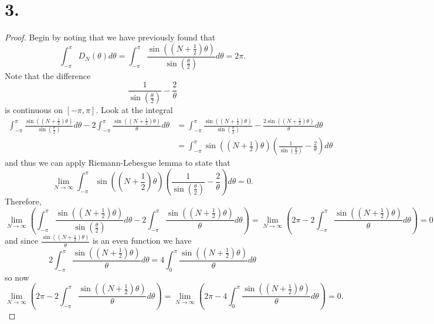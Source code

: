 \documentclass{article}
\begin{document}
\section*{3.}
\begin{proof}
    Begin by noting that we have previously found that 
    \[
    \int_{-\pi}^{\pi} D_N(\theta)d \theta = \int_{-\pi}^{\pi} \frac{\sin\left(\left(N + \frac{1}{2} \right)\theta\right)}{\sin\left(\frac{\theta}{2}\right)} d \theta = 2 \pi.    
    \]
    Note that the difference \[
    \frac{1}{\sin\left(\frac{\theta}{2}\right)} - \frac{2}{\theta}    
    \]
    is continuous on $[-\pi, \pi]$. 
    Look at the integral 
    \begin{align*}
     \int_{-\pi}^{\pi} \frac{\sin\left(\left(N + \frac{1}{2} \right)\theta\right)}{\sin\left(\frac{\theta}{2}\right)} d \theta - 2 \int_{-\pi}^{\pi} \frac{\sin\left(\left(N + \frac{1}{2} \right)\theta\right)} {\theta} d \theta  &= 
    \int_{-\pi}^{\pi} \frac{\sin\left(\left(N + \frac{1}{2} \right)\theta\right)}{\sin\left(\frac{\theta}{2}\right)} - \frac{2\sin\left(\left(N + \frac{1}{2} \right)\theta\right)} {\theta} d \theta\\ &= \int_{-\pi}^{\pi} \sin\left(\left(N + \frac{1}{2} \right)\theta\right) \left(\frac{1}{\sin\left(\frac{\theta}{2} \right)} - \frac{2}{\theta} \right) d\theta
    \end{align*}
    and thus we can apply Riemann-Lebesgue lemma to state that
    \[
    \lim\limits_{N \to \infty} \int_{-\pi}^{\pi} \sin\left(\left(N + \frac{1}{2} \right)\theta\right) \left(\frac{1}{\sin\left(\frac{\theta}{2} \right)} - \frac{2}{\theta} \right) d\theta = 0. 
    \]
    Therefore, 
    \[
    \lim\limits_{N \to \infty} \left( \int_{-\pi}^{\pi} \frac{\sin\left(\left(N + \frac{1}{2} \right)\theta\right)}{\sin\left(\frac{\theta}{2}\right)} d \theta - 2 \int_{-\pi}^{\pi} \frac{\sin\left(\left(N + \frac{1}{2} \right)\theta\right)} {\theta} d \theta \right) = \lim\limits_{N \to \infty}\left(2 \pi   - 2 \int_{-\pi}^{\pi} \frac{\sin\left(\left(N + \frac{1}{2} \right)\theta\right)} {\theta} d \theta \right) = 0  
    \]
    and since $\frac{\sin\left(\left(N + \frac{1}{2} \right)\theta\right)} {\theta}$ is an even function we have 
    \[
        2 \int_{-\pi}^{\pi} \frac{\sin\left(\left(N + \frac{1}{2} \right)\theta\right)} {\theta} d \theta = 4 \int_{0}^{\pi} \frac{\sin\left(\left(N + \frac{1}{2} \right)\theta\right)} {\theta} d \theta
    \]
    so now \[
        \lim\limits_{N \to \infty}\left(2 \pi   - 2 \int_{-\pi}^{\pi} \frac{\sin\left(\left(N + \frac{1}{2} \right)\theta\right)} {\theta} d \theta \right) = \lim\limits_{N \to \infty}\left(2 \pi   - 4 \int_{0}^{\pi} \frac{\sin\left(\left(N + \frac{1}{2} \right)\theta\right)} {\theta} d \theta \right) = 0.
\]
\end{proof}
\end{document}
